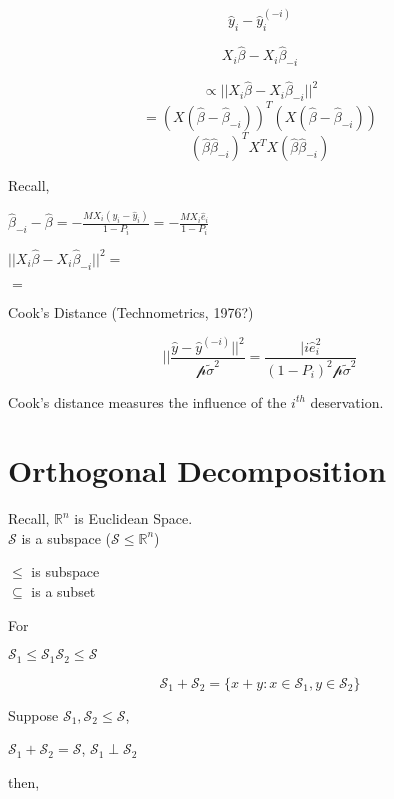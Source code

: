 \documentclass[11pt,fleqn]{book} %
\begin{document}
$$\hat{y}_i - \hat{y}_i^{(-i)} $$

$$X_i\hat{\beta} - X_i\hat{\beta}_{-i} $$

	$$\propto || X_i\hat{\beta} - X_i\hat{\beta}_{-i} ||^2	$$
	$$= (X(\hat{\beta} - \hat{\beta}_{-i}))^T (X(\hat{\beta} - \hat{\beta}_{-i})) $$
	$$(\hat{\beta} \hat{\beta}_{-i})^T X^TX (\hat{\beta} \hat{\beta}_{-i}) $$


Recall, 

$\hat{\beta}_{-i} - \hat{\beta} = -\frac{MX_i (y_i - \hat{y}_i)}{1 - P_i} = - \frac{MX_i \hat{e}_i}{1 - P_i}$

$|| X_i\hat{\beta} - X_i\hat{\beta}_{-i} ||^2 = \frac{}{} $

$= $


Cook's Distance (Technometrics, 1976?)

$$||\frac {\hat{y} - \hat{y}^{(-i)} ||^2}{\mathscr{p} \tilde{\sigma}^2} = \frac{|i \hat{e}_i^2}{(1 - P_i)^2 \mathscr{p} \tilde{\sigma}^2} $$

\begin{definition} Cook's distance measures the influence of the $i^{th}$ deservation.
\end{definition}

\section{Orthogonal Decomposition}

Recall,
$\mathbb{R}^n$ is Euclidean Space.\\

$\mathscr{S}$ is a subspace ($\mathscr{S} \leq \mathbb{R}^n$)

\begin{remark}
	$\leq$ is subspace\\
	$\subseteq$ is a subset
\end{remark}

For 

$\mathscr{S}_1 \leq \mathscr{S}_1 \mathscr{S}_2 \leq \mathscr{S}$

$$\mathscr{S}_1 + \mathscr{S}_2 = \{x + y: x \in \mathscr{S}_1, y \in \mathscr{S}_2 \} $$


Suppose $\mathscr{S}_1, \mathscr{S}_2 \leq \mathscr{S}$, 

$\mathscr{S}_1 + \mathscr{S}_2 = \mathscr{S}$, $\mathscr{S}_1 \perp \mathscr{S}_2$

then, 
\end{document}
